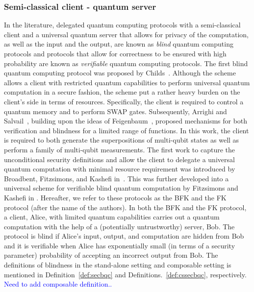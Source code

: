 \subsubsection{Semi-classical client - quantum server}
In the literature, delegated quantum computing protocols with a semi-classical client and a universal quantum server that allows for privacy of the computation, as well as the input and the output, are known as \emph{blind} quantum computing protocols and protocols that allow for correctness to be ensured with high probability are known as \emph{verifiable} quantum computing protocols. The first blind quantum computing protocol was proposed by Childs~\cite{childs2005secure}. Although the scheme allows a client with restricted quantum capabilities to perform universal quantum computation in a secure fashion, the scheme put a rather heavy burden on the client's side in terms of resources. Specifically, the client is required to control a quantum memory and to perform SWAP gates. Subsequently, Arrighi and Salvail~\cite{arrighi2006blind}, building upon the ideas of Feigenbaum~\cite{feigenbaum1985encrypting}, proposed mechanisms for both verification and blindness for a limited range of functions. In this work, the client is required to both generate the superpositions of multi-qubit states as well as perform a family of multi-qubit measurements. The first work to capture the unconditional security definitions and allow the client to delegate a universal quantum computation with minimal resource requirement was introduced by Broadbent, Fitzsimons, and Kashefi in~\cite{broadbent2009universal}. This was further developed into a universal scheme for verifiable blind quantum computation by Fitzsimons and Kashefi in \cite{fitzsimons2017unconditionally}. Hereafter, we refer to these protocols as the BFK and the FK protocol (after the name of the authors). In both the BFK and the FK protocol, a client, Alice, with limited quantum capabilities carries out a quantum computation with the help of a (potentially untrustworthy) server, Bob. The protocol is blind if Alice's input, output, and computation are hidden from Bob and it is verifiable when Alice has exponentially small (in terms of a security parameter) probability of accepting an incorrect output from Bob. The definitions of blindness in the stand-alone setting and composable setting is mentioned in Definition~\ref{def:secbqc} and Definitions.~\ref{def:cssecbqc}, respectively. \textcolor{blue}{Need to add composable definition..}


